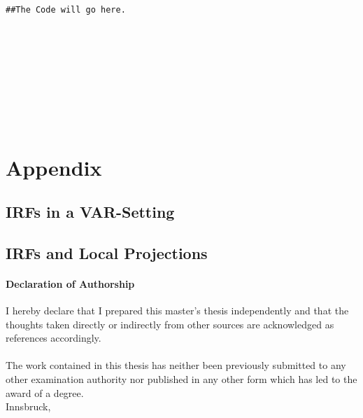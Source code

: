 \documentclass[a4paper,12pt,oneside,pointednumbers,bibtotoc,bigheadings,liststotoc]{scrbook}
\renewcommand*{\paragraph}[1]{\subsubsection*{#1} \vspace{-3mm}} %
\begin{document}
\begingroup
\fontsize{9pt}{12pt}\selectfont
\begin{verbatim}  
##The Code will go here.









\end{verbatim}  
\endgroup


\restoregeometry
\chapter{Appendix}
\label{VARAndLocalProjection}
\section{IRFs in a VAR-Setting}
\section{IRFs and Local Projections}


\nocite{*}
\clearpage
\thispagestyle{empty}







\clearpage
\thispagestyle{empty}
\null\vspace{46pt}
\paragraph{\large{Declaration of Authorship}}
\vspace{43pt}
I hereby declare that I prepared this master's thesis independently and that the thoughts taken
directly or indirectly from other sources are acknowledged as references accordingly. \\
\\
The work contained in this thesis has neither been previously submitted to any other examination authority nor published in any other form which has led to the award of a degree.\\[10mm]

    Innsbruck, \makebox[1.8in][l]{\hrulefill} \qquad \makebox[2.6in]{\hrulefill}\\
    \makebox[2.95in][l]      \hfill{}



\end{document}
